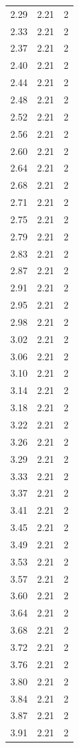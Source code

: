 \begin{longtable}{lrr}
  2.29 & 2.21 & 2 \\
  2.33 & 2.21 & 2 \\
  2.37 & 2.21 & 2 \\
  2.40 & 2.21 & 2 \\
  2.44 & 2.21 & 2 \\
  2.48 & 2.21 & 2 \\
  2.52 & 2.21 & 2 \\
  2.56 & 2.21 & 2 \\
  2.60 & 2.21 & 2 \\
  2.64 & 2.21 & 2 \\
  2.68 & 2.21 & 2 \\
  2.71 & 2.21 & 2 \\
  2.75 & 2.21 & 2 \\
  2.79 & 2.21 & 2 \\
  2.83 & 2.21 & 2 \\
  2.87 & 2.21 & 2 \\
  2.91 & 2.21 & 2 \\
  2.95 & 2.21 & 2 \\
  2.98 & 2.21 & 2 \\
  3.02 & 2.21 & 2 \\
  3.06 & 2.21 & 2 \\
  3.10 & 2.21 & 2 \\
  3.14 & 2.21 & 2 \\
  3.18 & 2.21 & 2 \\
  3.22 & 2.21 & 2 \\
  3.26 & 2.21 & 2 \\
  3.29 & 2.21 & 2 \\
  3.33 & 2.21 & 2 \\
  3.37 & 2.21 & 2 \\
  3.41 & 2.21 & 2 \\
  3.45 & 2.21 & 2 \\
  3.49 & 2.21 & 2 \\
  3.53 & 2.21 & 2 \\
  3.57 & 2.21 & 2 \\
  3.60 & 2.21 & 2 \\
  3.64 & 2.21 & 2 \\
  3.68 & 2.21 & 2 \\
  3.72 & 2.21 & 2 \\
  3.76 & 2.21 & 2 \\
  3.80 & 2.21 & 2 \\
  3.84 & 2.21 & 2 \\
  3.87 & 2.21 & 2 \\
  3.91 & 2.21 & 2 \\

\end{longtable}
